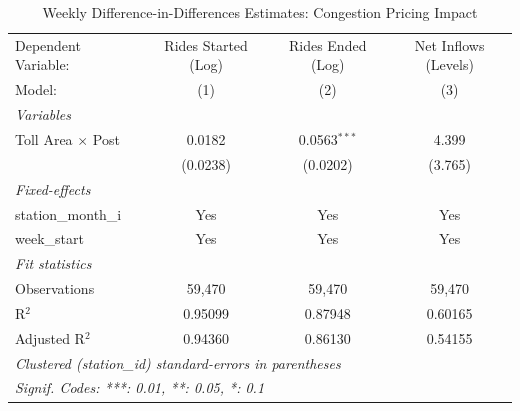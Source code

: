 
\begin{table}[htbp]
   \caption{\label{tab:did_static_weekly} Weekly Difference-in-Differences Estimates: Congestion Pricing Impact}
   \centering
   \begin{tabular}{lccc}
      \tabularnewline \midrule \midrule
      Dependent Variable:      & Rides Started (Log) & Rides Ended (Log) & Net Inflows (Levels) \\   
      Model:                   & (1)                 & (2)               & (3)\\  
      \midrule
      \emph{Variables}\\
      Toll Area $\times$ Post  & 0.0182              & 0.0563$^{***}$    & 4.399\\   
                               & (0.0238)            & (0.0202)          & (3.765)\\   
      \midrule
      \emph{Fixed-effects}\\
      station\_month\_i        & Yes                 & Yes               & Yes\\  
      week\_start              & Yes                 & Yes               & Yes\\  
      \midrule
      \emph{Fit statistics}\\
      Observations             & 59,470              & 59,470            & 59,470\\  
      R$^2$                    & 0.95099             & 0.87948           & 0.60165\\  
      Adjusted R$^2$           & 0.94360             & 0.86130           & 0.54155\\  
      \midrule \midrule
      \multicolumn{4}{l}{\emph{Clustered (station\_id) standard-errors in parentheses}}\\
      \multicolumn{4}{l}{\emph{Signif. Codes: ***: 0.01, **: 0.05, *: 0.1}}\\
   \end{tabular}
\end{table}


